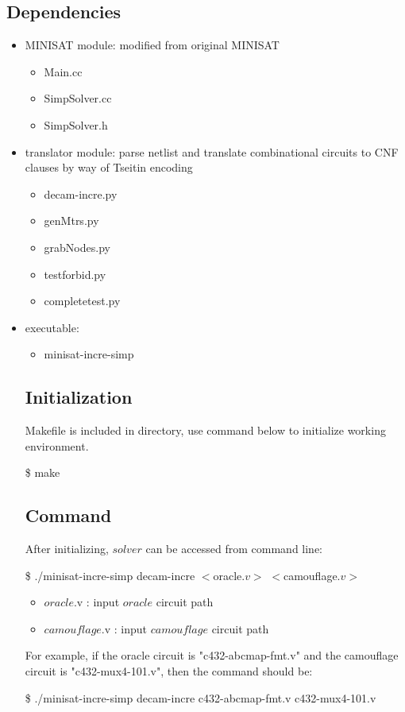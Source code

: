 \documentclass{article}
\begin{document}
	\subsection{Dependencies}
		\begin{itemize}
			\item MINISAT module: modified from original MINISAT
				\begin{itemize}
					\item Main.cc
					\item SimpSolver.cc
					\item SimpSolver.h
				\end{itemize}
			\item translator module: parse netlist and translate combinational circuits to CNF clauses by way of Tseitin encoding
				\begin{itemize}
					\item decam-incre.py
					\item genMtrs.py
					\item grabNodes.py
					\item testforbid.py
					\item completetest.py
				\end{itemize}
			\item executable: 
				\begin{itemize}
					\item minisat-incre-simp
				\end{itemize}
		
	\subsection{Initialization}
		Makefile is included in directory, use command below to initialize working environment.
		\newline 
		\centerline{\$ make}
	\subsection{Command}
		After initializing, $solver$ can be accessed from command line:
		\newline
		\centerline{ \$ ./minisat-incre-simp decam-incre $<$oracle$.v>$ $<$camouflage$.v>$}
			\begin{itemize}
				\item $oracle$.v : input $oracle$ circuit path 
				\item $camouflage$.v : input $camouflage$ circuit path
			\end{itemize}
		For example, if the oracle circuit is "c432-abcmap-fmt.v" and the camouflage circuit is "c432-mux4-101.v", then the command should be:
		\newline
		\centerline{\$ ./minisat-incre-simp decam-incre c432-abcmap-fmt.v c432-mux4-101.v}

\end{itemize}
\end{document}
